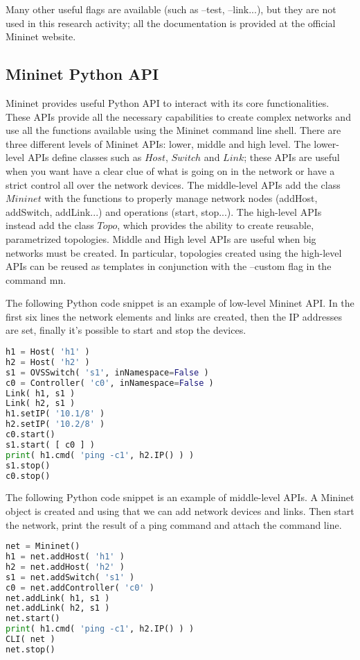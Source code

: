 \documentclass[a4paper,10pt]{memoir}
\begin{document}
Many other useful flags are available (such as --test, --link...), but they are not used in this research activity; all the documentation is provided at the official Mininet website.

\subsection{Mininet Python API}
Mininet provides useful Python API to interact with its core functionalities. These APIs provide all the necessary capabilities to create complex networks and use all the functions available using the Mininet command line shell. There are three different levels of Mininet APIs: lower, middle and high level. The lower-level APIs define classes such as $Host$, $Switch$ and $Link$; these APIs are useful when you want have a clear clue of what is going on in the network or have a strict control all over the network devices. The middle-level APIs add the class $Mininet$ with the functions to properly manage network nodes (addHost, addSwitch, addLink...) and operations (start, stop...). The high-level APIs instead add the class $Topo$, which provides the ability to create reusable, parametrized topologies. Middle and High level APIs are useful when big networks must be created. In particular, topologies created using the high-level APIs can be reused as templates in conjunction with the --custom flag in the command mn.

The following Python code snippet is an example of low-level Mininet API. In the first six lines the network elements and links are created, then the IP addresses are set, finally it's possible to start and stop the devices.
\begin{lstlisting}[language=python]
h1 = Host( 'h1' )
h2 = Host( 'h2' )
s1 = OVSSwitch( 's1', inNamespace=False )
c0 = Controller( 'c0', inNamespace=False )
Link( h1, s1 )
Link( h2, s1 )
h1.setIP( '10.1/8' )
h2.setIP( '10.2/8' )
c0.start()
s1.start( [ c0 ] )
print( h1.cmd( 'ping -c1', h2.IP() ) )
s1.stop()
c0.stop() 
\end{lstlisting}

The following Python code snippet is an example of middle-level APIs. A Mininet object is created and using that we can add network devices and links. Then start the network, print the result of a ping command and attach the command line.
\begin{lstlisting}[language=python]
net = Mininet()
h1 = net.addHost( 'h1' )
h2 = net.addHost( 'h2' )
s1 = net.addSwitch( 's1' )
c0 = net.addController( 'c0' )
net.addLink( h1, s1 )
net.addLink( h2, s1 )
net.start()
print( h1.cmd( 'ping -c1', h2.IP() ) )
CLI( net )
net.stop()
\end{lstlisting}
\end{document}
